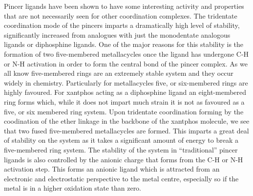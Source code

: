 Pincer ligands have been shown to have some interesting activity and properties that are not necessarily seen for other coordination complexes.  The tridentate coordination mode of the pincers imparts a dramatically high level of stability, significantly increased from analogues with just the monodentate analogous ligands or diphosphine ligands.  One of the major reasons for this stability is the formation of two five-membered metallacycles once the ligand has undergone C-H or N-H activation in order to form the central bond of the pincer complex.  As we all know five-membered rings are an extremely stable system and they occur widely in chemistry.  Particularly for metallacycles five, or six-membered rings are highly favoured.  For xantphos acting as a diphosphine ligand an eight-membered ring forms which, while it does not impart much strain it is not as favoured as a five, or six membered ring system.  Upon tridentate coordination forming by the coodination of the ether linkage in the backbone of the xantphos molecule, we see that two fused five-membered metallacycles are formed.  This imparts a great deal of stability on the system as it takes a significant amount of energy to break a five-membered ring system.  The stability of the system in ``traditional'' pincer ligands is also controlled by the anionic charge that forms from the C-H or N-H activation step.  This forms an anionic ligand which is attracted from an electronic and electrostatic perspective to the metal centre, especially so if the metal is in a higher oxidation state than zero.  

